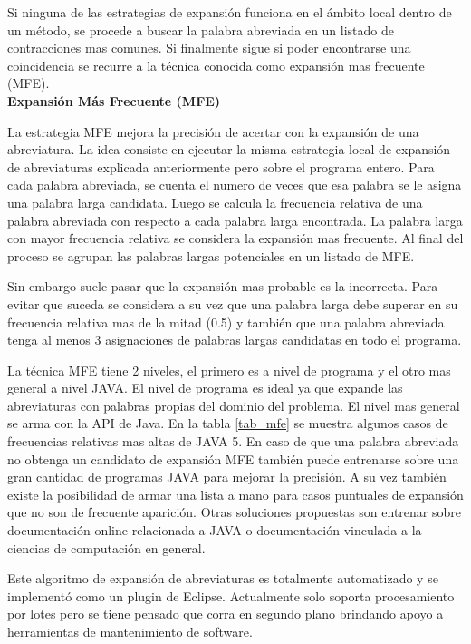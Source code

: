 \documentclass[12pt]{report}
\begin{document}
Si ninguna de las estrategias de expansión funciona en el ámbito local dentro de un método, se procede a buscar la palabra abreviada en un listado de contracciones mas comunes. Si finalmente sigue si poder encontrarse una coincidencia se recurre a la técnica conocida como expansión mas frecuente (MFE).\\

\noindent \textbf{Expansión Más Frecuente (MFE)\\}

La estrategia MFE\cite{EZH08} mejora la precisión de acertar con la expansión de una abreviatura. La idea consiste en ejecutar la misma estrategia local de expansión de abreviaturas explicada anteriormente pero sobre el programa entero. Para cada palabra abreviada, se cuenta el numero de veces que esa palabra se le asigna una palabra larga candidata. Luego se calcula la frecuencia relativa de una palabra abreviada con respecto a cada palabra larga encontrada. La palabra larga con mayor frecuencia relativa se considera la expansión mas frecuente. Al final del proceso se agrupan las palabras largas potenciales en un listado de MFE.

Sin embargo suele pasar que la expansión mas probable es la incorrecta. Para evitar que suceda se considera a su vez que una palabra larga debe superar en su frecuencia relativa mas de la mitad (0.5) y también que una palabra abreviada tenga al menos 3 asignaciones de palabras largas candidatas en todo el programa.

La técnica MFE tiene 2 niveles, el primero es a nivel de programa y el otro mas general a nivel JAVA. El nivel de programa es ideal ya que expande las abreviaturas con palabras propias del dominio del problema. El nivel mas general se arma con la API de Java. En la tabla \ref{tab_mfe} se muestra algunos casos de frecuencias relativas mas altas de JAVA 5. En caso de que una palabra abreviada no obtenga un candidato de expansión MFE también puede entrenarse sobre una gran cantidad de programas JAVA para mejorar la precisión. A su vez también existe la posibilidad de armar una lista a mano para casos puntuales de expansión que no son de frecuente aparición. Otras soluciones propuestas son entrenar sobre documentación online relacionada a JAVA o documentación vinculada a la ciencias de computación en general.

Este algoritmo de expansión de abreviaturas es totalmente automatizado y se implementó como un plugin de Eclipse. Actualmente solo soporta procesamiento por lotes pero se tiene pensado que corra en segundo plano brindando apoyo a herramientas de mantenimiento de software\cite{EZH08}.
\end{document}
